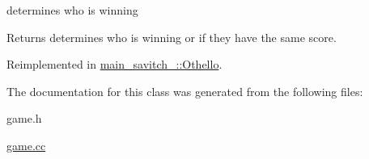 determines who is winning 

\begin{DoxyReturn}{Returns}
determines who is winning or if they have the same score. 
\end{DoxyReturn}


Reimplemented in \hyperlink{classmain__savitch__14_1_1Othello_a8934d1b63f73c03dae9629dbe03955d7}{main\+\_\+savitch\+\_\+::\+Othello}.



The documentation for this class was generated from the following files\+:\begin{DoxyCompactItemize}
\item 
game.\+h\item 
\hyperlink{game_8cc}{game.\+cc}\end{DoxyCompactItemize}
